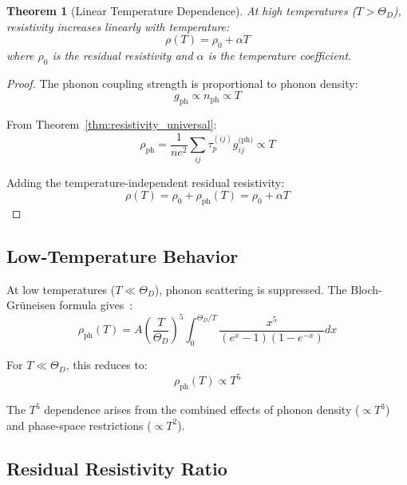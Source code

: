\documentclass[twocolumn,showpacs,preprintnumbers,amsmath,amssymb,prd]{revtex4-2}
\newtheorem{theorem}{Theorem}[section]
\newcommand{\taup}{\tau_p}
\begin{document}
\begin{theorem}[Linear Temperature Dependence]
\label{thm:linear_t}
At high temperatures ($T > \Theta_D$), resistivity increases linearly with temperature:
\begin{equation}
\rho(T) = \rho_0 + \alpha T
\label{eq:linear_rho}
\end{equation}
where $\rho_0$ is the residual resistivity and $\alpha$ is the temperature coefficient.
\end{theorem}

\begin{proof}
The phonon coupling strength is proportional to phonon density:
\begin{equation}
g_{\text{ph}} \propto n_{\text{ph}} \propto T
\label{eq:phonon_coupling_t}
\end{equation}

From Theorem~\ref{thm:resistivity_universal}:
\begin{equation}
\rho_{\text{ph}} = \frac{1}{ne^2} \sum_{ij} \taup^{(ij)} g_{ij}^{\text{(ph)}} \propto T
\label{eq:rho_ph_t}
\end{equation}

Adding the temperature-independent residual resistivity:
\begin{equation}
\rho(T) = \rho_0 + \rho_{\text{ph}}(T) = \rho_0 + \alpha T
\end{equation}
\end{proof}

\subsection{Low-Temperature Behavior}

At low temperatures ($T \ll \Theta_D$), phonon scattering is suppressed. The Bloch-Gr\"{u}neisen formula gives~\cite{Ziman1960}:
\begin{equation}
\rho_{\text{ph}}(T) = A\left(\frac{T}{\Theta_D}\right)^5 \int_0^{\Theta_D/T} \frac{x^5}{(e^x - 1)(1 - e^{-x})} dx
\label{eq:bloch_gruneisen}
\end{equation}

For $T \ll \Theta_D$, this reduces to:
\begin{equation}
\rho_{\text{ph}}(T) \propto T^5
\label{eq:t5}
\end{equation}

The $T^5$ dependence arises from the combined effects of phonon density ($\propto T^3$) and phase-space restrictions ($\propto T^2$).

\subsection{Residual Resistivity Ratio}
\end{document}
